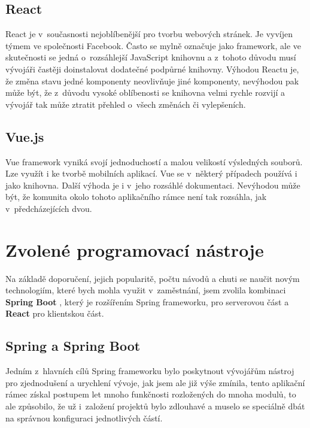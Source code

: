 \subsection{React}
\label{reactFirst}

React je v~současnosti nejoblíbenější  pro tvorbu webových stránek. Je vyvíjen týmem ve společnosti Facebook. Často se mylně označuje jako framework, ale ve skutečnosti se jedná o~rozsáhlejší JavaScript knihovnu a z~tohoto důvodu musí vývojáři častěji doinstalovat dodatečné podpůrné knihovny. Výhodou Reactu je, že změna stavu jedné komponenty neovlivňuje jiné komponenty, nevýhodou pak může být, že z~důvodu vysoké oblíbenosti se knihovna velmi rychle rozvijí a vývojář tak může ztratit přehled o~všech změnách či vylepšeních.

\subsection{Vue.js}

Vue framework vyniká svojí jednoduchostí a malou velikostí výsledných souborů. Lze využít i ke tvorbě mobilních aplikací. Vue se v~některý případech používá i jako knihovna. Další výhoda je i v~jeho rozsáhlé dokumentaci. Nevýhodou může být, že komunita okolo tohoto aplikačního rámce není tak rozsáhla, jak v~předcházejících dvou.


\section{Zvolené programovací nástroje}

Na základě doporučení, jejich popularitě, počtu návodů a chuti se naučit novým technologiím, které bych mohla využit v~zaměstnání, jsem zvolila kombinaci \textbf{Spring Boot} \cite{Spring}, který je rozšířením Spring frameworku, pro serverovou část a \textbf{React} \cite{React} pro klientskou část.

\subsection{Spring a Spring Boot}

Jedním z~hlavních cílů Spring frameworku bylo poskytnout vývojářům nástroj pro zjednodušení a urychlení vývoje, jak jsem ale již výše zmínila, tento aplikační rámec získal postupem let mnoho funkčnosti rozložených do mnoha modulů, to ale způsobilo, že už i~založení projektů bylo zdlouhavé a muselo se speciálně dbát na správnou konfiguraci jednotlivých částí.

